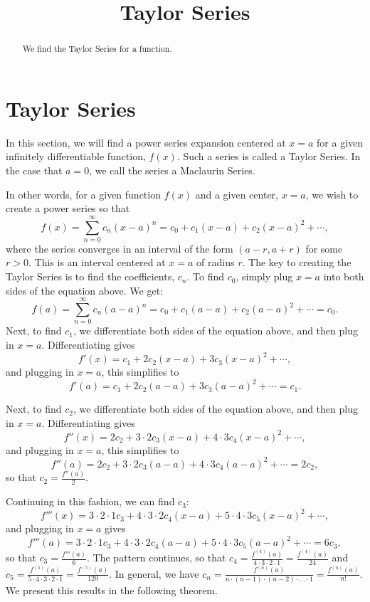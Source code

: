 \documentclass{ximera}
\title{Taylor Series}
\begin{document}
\begin{abstract}
We find the Taylor Series for a function.
\end{abstract}

\maketitle

\section{Taylor Series}

In this section, we will find a power series expansion centered at $x = a$ for a given infinitely differentiable function, $f(x)$.
Such a series is called a Taylor Series.  In the case that $a = 0$, we call the series a Maclaurin Series.

In other words, for a given function $f(x)$ and a given center, $x = a$, we wish to create a power series so that
\[
f(x) = \sum_{n=0}^\infty c_n (x-a)^n = c_0 + c_1(x-a) + c_2(x-a)^2 + \cdots,
\]
where the series converges in an interval of the form $(a-r, a+r)$ for some $r >0$. This is an interval centered at $x = a$ of radius $r$.
The key to creating the Taylor Series is to find the coefficients, $c_n$.
To find $c_0$, simply plug $x = a$ into both sides of the equation above. We get:
\[
f(a) = \sum_{n=0}^\infty c_n (a-a)^n = c_0 + c_1(a-a) + c_2(a-a)^2 + \cdots = c_0.
\]
Next, to find $c_1$, we differentiate both sides of the equation above, and then plug in $x = a$.
Differentiating gives
\[
f'(x) = c_1 + 2c_2(x-a) + 3c_3(x-a)^2 + \cdots,
\]
and plugging in $x = a$, this simplifies to 
\[
f'(a) = c_1 + 2c_2(a-a) + 3c_3(a-a)^2 + \cdots = c_1.
\]

Next, to find $c_2$, we differentiate both sides of the equation above, and then plug in $x = a$.
Differentiating gives
\[
f''(x) = 2c_2 + 3\cdot 2 c_3(x-a) + 4\cdot 3 c_4(x-a)^2 + \cdots,
\]
and plugging in $x = a$, this simplifies to 
\[
f''(a) = 2c_2 + 3\cdot 2 c_3(a-a) + 4\cdot 3 c_4(a-a)^2 + \cdots = 2c_2,
\]
so that $c_2 = \frac{f''(a)}{2}$.

Continuing in this fashion, we can find $c_3$:
\[
f'''(x) = 3 \cdot 2 \cdot 1 c_3 + 4\cdot 3 \cdot 2 c_4 (x-a) + 5 \cdot 4 \cdot 3 c_5 (x-a)^2 + \cdots,
\]
and plugging in $x = a$ gives
\[
f'''(a) = 3 \cdot 2 \cdot 1 c_3 + 4\cdot 3 \cdot 2 c_4 (a-a) + 5 \cdot 4 \cdot 3 c_5 (a-a)^2 + \cdots = 6c_3,
\]
so that $c_3 = \frac{f'''(a)}{6}$.
The pattern continues, so that $c_4 = \frac{f^{(4)}(a)}{4\cdot 3 \cdot 2 \cdot 1} = \frac{f^{(4)}(a)}{24}$
and $c_5 = \frac{f^{(5)}(a)}{5\cdot 4 \cdot 3 \cdot 2 \cdot 1} = \frac{f^{(5)}(a)}{120}$.
In general, we have $c_n = \frac{f^{(n)}(a)}{n\cdot (n-1) \cdot (n-2) \cdot \dots \cdot 1} = \frac{f^{(n)}(a)}{n!}$.
We present this results in the following theorem.
\end{document}
